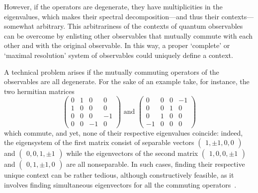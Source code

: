 \documentclass[
  twocolumn,
 showpacs,
 showkeys,
 preprintnumbers,
 amsmath,amssymb,
 aps,
 pra,
  longbibliography,
 floatfix,
 ]{revtex4-2}
\begin{document}



However, if the operators are degenerate, they have multiplicities in the eigenvalues,
which makes their spectral decomposition---and thus their contexts---somewhat arbitrary.
This arbitrariness of the contexts of quantum observables can be overcome
by enlisting other observables that mutually commute with each other and with the original observable.
In this way, a proper `complete' or `maximal resolution' system of observables could uniquely define a context.


A technical problem arises if the mutually commuting operators of the observables are all degenerate.
For the sake of an example take, for instance, the two hermitian matrices
\[
\begin{pmatrix}
0 &  1 &  0 &  0 \\  1 &  0 &  0 &  0 \\  0 &  0 &  0 &  -1 \\  0 &  0 &  -1 &  0
\end{pmatrix}
\text{ and }
\begin{pmatrix}
0 &  0 &  0 &  -1 \\  0 &  0 &  1 &  0 \\  0 &  1 &  0 &  0 \\  -1 &  0 &  0 &  0
\end{pmatrix}
\]
which commute, and yet, none of their respective eigenvalues coincide: indeed, the eigensystem of the first matrix consist of separable vectors
$
\begin{pmatrix}
1 ,  \pm 1 ,  0 , 0
\end{pmatrix}
$
and
$
\begin{pmatrix}
 0 , 0  , 1 ,  \pm 1
\end{pmatrix}
$
while
the eigenvectors of the second matrix
$
\begin{pmatrix}
1  ,  0 , 0 ,  \pm 1
\end{pmatrix}
$
and
$
\begin{pmatrix}
 0  , 1 ,  \pm 1 , 0
\end{pmatrix}
$
 are all nonseparable.
In such cases, finding their respective unique context can be rather tedious, although constructively feasible,
as it involves finding simultaneous eigenvectors for all the commuting operators~\cite[Section 1.3]{Horn-Johnson-MatrixAnalysis}.
\end{document}

